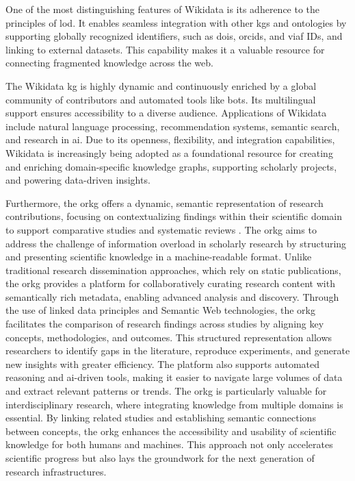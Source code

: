 One of the most distinguishing features of Wikidata is its adherence to the principles of \gls{lod}.
It enables seamless integration with other \glspl{kg} and ontologies by supporting globally recognized identifiers, such as \glspl{doi}, \glspl{orcid}, and \gls{viaf} IDs, and linking to external datasets.
This capability makes it a valuable resource for connecting fragmented knowledge across the web.

The Wikidata \gls{kg} is highly dynamic and continuously enriched by a global community of contributors and automated tools like bots.
Its multilingual support ensures accessibility to a diverse audience.
Applications of Wikidata include natural language processing, recommendation systems, semantic search, and research in \gls{ai}.
Due to its openness, flexibility, and integration capabilities, Wikidata is increasingly being adopted as a foundational resource for creating and enriching domain-specific knowledge graphs, supporting scholarly projects, and powering data-driven insights.

Furthermore, the \gls{orkg} offers a dynamic, semantic representation of research contributions, focusing on contextualizing findings within their scientific domain to support comparative studies and systematic reviews \cite{ORKG}.
The \gls{orkg} aims to address the challenge of information overload in scholarly research by structuring and presenting scientific knowledge in a machine-readable format.
Unlike traditional research dissemination approaches, which rely on static publications, the \gls{orkg} provides a platform for collaboratively curating research content with semantically rich metadata, enabling advanced analysis and discovery.
Through the use of linked data principles and Semantic Web technologies, the \gls{orkg} facilitates the comparison of research findings across studies by aligning key concepts, methodologies, and outcomes.
This structured representation allows researchers to identify gaps in the literature, reproduce experiments, and generate new insights with greater efficiency.
The platform also supports automated reasoning and \gls{ai}-driven tools, making it easier to navigate large volumes of data and extract relevant patterns or trends.
The \gls{orkg} is particularly valuable for interdisciplinary research, where integrating knowledge from multiple domains is essential.
By linking related studies and establishing semantic connections between concepts, the \gls{orkg} enhances the accessibility and usability of scientific knowledge for both humans and machines.
This approach not only accelerates scientific progress but also lays the groundwork for the next generation of research infrastructures.

